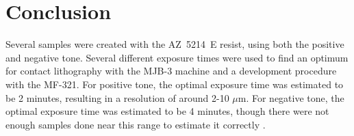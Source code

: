 \section*{Conclusion}
Several samples were created with the AZ~5214~E resist, using both the positive and negative tone. Several different exposure times were used to find an optimum for contact lithography with the MJB-3 machine and a development procedure with the MF-321. For positive tone, the optimal exposure time was estimated to be 2 minutes, resulting in a resolution of around 2-10 $\mu$m. For negative tone, the optimal exposure time was estimated to be 4 minutes, though there were not enough samples done near this range to estimate it correctly .